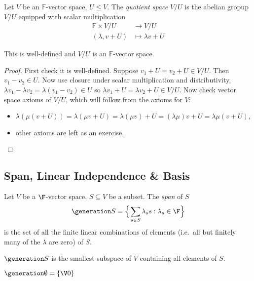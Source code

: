 \documentclass[a4paper]{article}
\newcommand*{\spans}{\generation}
\theoremstyle{definition}
\begin{document}
\begin{definition}
  Let $V$ be an $\mathbb{F}$-vector space, $U \leq V$. The \emph{quotient space} $V/U$ is the abelian gropup $V/U$ equipped with scalar multiplication
  \begin{align*}
    \mathbb{F} \times V/U &\to V/U \\
    (\lambda, v+U) &\mapsto \lambda v+U
  \end{align*}
\end{definition}

\begin{proposition}
  This is well-defined and $V/U$ is an $\mathbb{F}$-vector space.
\end{proposition}

\begin{proof}
  First check it is well-defined. Suppose $v_1+U= v_2+U \in V/U$. Then $v_1-v_2\in U$. Now use closure under scalar multiplication and distributivity, $\lambda v_1 - \lambda v_2 = \lambda(v_1-v_2)\in U$ so $\lambda v_1 + U = \lambda v_2 +U\in V/U$.
  Now check vector space axioms of $V/U$, which will follow from the axioms for $V$:
  \begin{itemize}
  \item $\lambda(\mu(v+U)) = \lambda(\mu v+U) = \lambda(\mu v)+U = (\lambda\mu) v+U = \lambda\mu(v+U)$,
  \item other axioms are left as an exercise.
  \end{itemize}
\end{proof}

\subsection{Span, Linear Independence \& Basis}

\begin{definition}[Span]
  Let $V$ be a $\F$-vector space, $S \subseteq V$ be a subset. The \emph{span} of $S$
  \[
    \spans S = \Big\{\sum_{s\in S} \lambda_s s : \lambda_s \in \F \Big\}
  \]
  is the set of all the finite linear combinations of elements (i.e.\ all but finitely many of the $\lambda$ are zero) of $S$.
\end{definition}

\begin{remark}
  $\spans S$ is the smallest subspace of $V$ containing all elements of $S$.
\end{remark}

\begin{convention}
  $\spans \emptyset = \{\V 0\}$
\end{convention}
\end{document}
